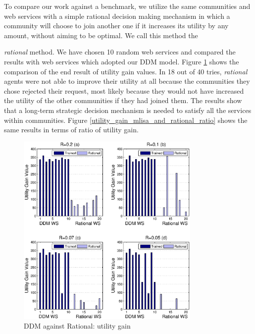 \documentclass[11pt,onecolumn]{IEEEtran}
\begin{document}
To compare our work against a benchmark, we utilize the same communities and web services with a simple rational decision making mechanism in which a community will choose to join another one if it increases its utility by any amount, without aiming to be optimal. We call this method the {\textit{rational} method. We have chosen 10 random web services and compared the results with web services which adopted our DDM model. Figure \ref{utility_gain_mlisa_and_rational} shows the comparison of the end result of utility gain values. In 18 out of 40 tries, \emph{rational} agents were not able to improve their utility at all because the communities they chose rejected their request, most likely because they would not have increased the utility of the other communities if they had joined them. The results show that a long-term strategic decision mechanism is needed to satisfy all the services within communities. Figure \ref{utility_gain_mlisa_and_rational_ratio} shows the same results in terms of ratio of utility gain.

\begin{figure}%
\centering
\includegraphics[width=3.5in]{figures/utility_gain.eps}
\caption{DDM against Rational: utility gain }
\label{utility_gain_mlisa_and_rational}
\end{figure}

}
\end{document}
